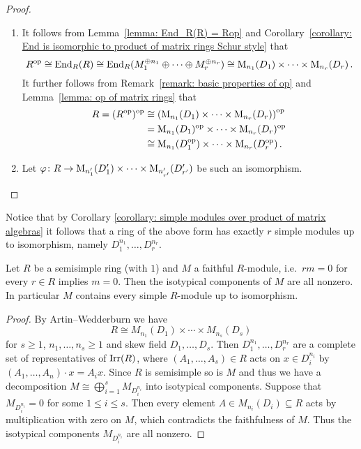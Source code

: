 \begin{proof}
  \leavevmode
  \begin{enumerate}
    \item
      It follows from Lemma~\ref{lemma: End_R(R) = Rop} and Corollary~\ref{corollary: End is isomorphic to product of matrix rings Schur style} that
      \[
                R^{\mathrm{op}}
        \cong   \operatorname{End}_R(R)
        \cong   \operatorname{End}_R(M_1^{\oplus n_1} \oplus \dotsb \oplus M_r^{\oplus n_r})
        \cong   \operatorname{M}_{n_1}(D_1) \times \dotsb \times \operatorname{M}_{n_r}(D_r) \,.
      \]
      It further follows from Remark~\ref{remark: basic properties of op} and Lemma~\ref{lemma: op of matrix rings} that
      \begin{align*}
                R
        =      (R^{\mathrm{op}})^{\mathrm{op}}
        &\cong  \left( \operatorname{M}_{n_1}(D_1) \times \dotsb \times \operatorname{M}_{n_r}(D_r) \right)^{\mathrm{op}} \\
        &=      \operatorname{M}_{n_1}(D_1)^{\mathrm{op}} \times \dotsb \times \operatorname{M}_{n_r}(D_r)^{\mathrm{op}}  \\
        &\cong  \operatorname{M}_{n_1}(D_1^{\mathrm{op}}) \times \dotsb \times \operatorname{M}_{n_r}(D_r^{\mathrm{op}}) \,.
      \end{align*}
    \item
      Let $\varphi \colon R \to \operatorname{M}_{n'_1}(D'_1) \times \dotsb \times \operatorname{M}_{n'_{r'}}(D'_{r'})$ be such an isomorphism.
      
  \end{enumerate}
\end{proof}



Notice that by Corollary \ref{corollary: simple modules over product of matrix algebras} it follows that a ring of the above form has exactly $r$ simple modules up to isomorphism, namely $D_1^{n_1}, \dotsc, D_r^{n_r}$.


\begin{corollary}
  Let $R$ be a semisimple ring (with $1$) and $M$ a faithful $R$-module, i.e.\ $rm = 0$ for every $r \in R$ implies $m = 0$.
  Then the isotypical components of $M$ are all nonzero.
  In particular $M$ contains every simple $R$-module up to isomorphism.
\end{corollary}
\begin{proof}
  By Artin--Wedderburn we have
  \[
    R \cong M_{n_1}(D_1) \times \dotsb \times M_{n_s}(D_s)
  \]
  for $s \geq 1$, $n_1, \dotsc, n_s \geq 1$ and skew field $D_1, \dotsc, D_s$.
  Then $D_1^{n_1}, \dotsc, D_r^{n_r}$ are a complete set of representatives of $\operatorname{Irr}(R)$, where $(A_1, \dotsc, A_s) \in R$ acts on $x \in D_i^{n_i}$ by $(A_1, \dotsc, A_n) \cdot x = A_i x$.
  Since $R$ is semisimple so is $M$ and thus we have a decomposition $M \cong \bigoplus_{i=1}^s M_{D_i^{n_i}}$ into isotypical components.
  Suppose that $M_{D_i^{n_i}} = 0$ for some $1 \leq i \leq s$.
  Then every element $A \in M_{n_i}(D_i) \subseteq R$ acts by multiplication with zero on $M$, which contradicts the faithfulness of $M$.
  Thus the isotypical components $M_{D_i^{n_i}}$ are all nonzero.
\end{proof}




